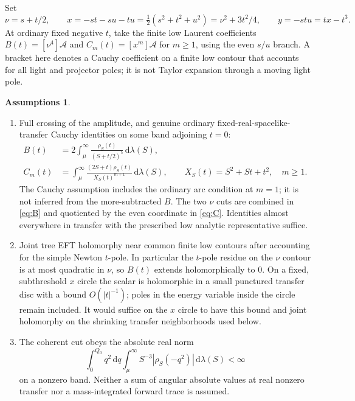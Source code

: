 \documentclass[11pt,a4paper]{article}
\theoremstyle{definition}
\newtheorem{assumption}[theorem]{Assumptions}
\theoremstyle{remark}
\newcommand{\dS}{\mathrm{d}}
\begin{document}
Set
\begin{equation}\label{eq:coords}
 \nu=s+t/2,\qquad x=-st-su-tu=\tfrac12(s^2+t^2+u^2)
     =\nu^2+3t^2/4,\qquad y=-stu=tx-t^3 .
\end{equation}
At ordinary fixed negative $t$, take the finite low Laurent coefficients
$B(t)=[\nu^4]\mathcal A$ and $C_m(t)=[x^m]\mathcal A$ for $m\ge1$, using the even $s/u$ branch. A bracket here denotes a Cauchy coefficient on a finite low contour that accounts for all light and projector poles; it is not Taylor expansion through a moving light pole.

\begin{assumption}\label{ass:main}
\leavevmode
\begin{enumerate}
\item Full crossing of the amplitude, and genuine ordinary fixed-real-spacelike-transfer Cauchy identities on some band adjoining $t=0$:
\begin{align}
 B(t)&=2\int_{\mu}^\infty
       \frac{\rho_S(t)}{(S+t/2)^5}\,\dS\lambda(S),\label{eq:B}\\
 C_m(t)&=\int_{\mu}^\infty
       \frac{(2S+t)\rho_S(t)}{X_S(t)^{m+1}}\,\dS\lambda(S),
       \qquad X_S(t)=S^2+St+t^2,\quad m\ge1.\label{eq:C}
\end{align}
The Cauchy assumption includes the ordinary arc condition at $m=1$; it is not inferred from the more-subtracted $B$. The two $\nu$ cuts are combined in \eqref{eq:B} and quotiented by the even coordinate in \eqref{eq:C}. Identities almost everywhere in transfer with the prescribed low analytic representative suffice.
\item Joint tree EFT holomorphy near common finite low contours after accounting for the simple Newton $t$-pole. In particular the $t$-pole residue on the $\nu$ contour is at most quadratic in $\nu$, so $B(t)$ extends holomorphically to $0$. On a fixed, subthreshold $x$ circle the scalar is holomorphic in a small punctured transfer disc with a bound $O(|t|^{-1})$; poles in the energy variable inside the circle remain included. It would suffice on the $x$ circle to have this bound and joint holomorphy on the shrinking transfer neighborhoods used below.
\item The coherent cut obeys the absolute real norm
\begin{equation}\label{eq:real}
 \int_0^{Q_0}q^2\,\dS q\int_\mu^\infty
 S^{-3}|\rho_S(-q^2)|\,\dS\lambda(S)<\infty
\end{equation}
on a nonzero band. Neither a sum of angular absolute values at real nonzero transfer nor a mass-integrated forward trace is assumed.

\end{enumerate}
\end{assumption}
\end{document}
